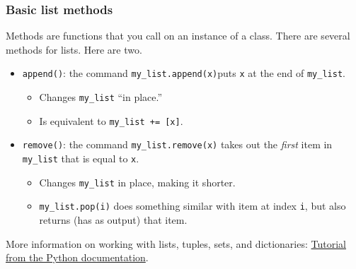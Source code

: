 \documentclass{beamer}
\theoremstyle{example}
\newcommand{\ct}[1]{\lstinline[language=Python]!#1!}
\newcommand{\ttt}[1]{\texttt{#1}}
\begin{document}
\begin{frame}
\frametitle{Basic list methods}

Methods are functions that you call on an instance of a class. There are several methods for lists. Here are two.
\pause
\begin{itemize}
	\item \ttt{append()}: the command \ttt{my}\ct{_}\ttt{list.append(x)}puts \ttt{x} at the end of \ttt{my}\ct{_}\ttt{list}. 
	\begin{itemize}
		\item Changes \ttt{my}\ct{_}\ttt{list} ``in place.''
		\pause
		\item Is equivalent to \ttt{my}\ct{_}\ttt{list += [x]}.
	\end{itemize}
	\pause
	\item \ttt{remove()}: the command \ttt{my}\ct{_}\ttt{list.remove(x)} takes out the \emph{first} item in \ttt{my}\ct{_}\ttt{list} that is equal to \ttt{x}.	
	\begin{itemize}
		\item Changes \ttt{my}\ct{_}\ttt{list} in place, making it shorter.
		\pause
		\item \ttt{my}\ct{_}\ttt{list.pop(i)} does something similar with item at index \ttt{i}, but also returns (has as output) that item.
	\end{itemize}
\end{itemize}

More information on working with lists, tuples, sets, and dictionaries: \href{https://docs.python.org/3/tutorial/datastructures.html}{Tutorial from the Python documentation}.

\end{frame}
\end{document}
